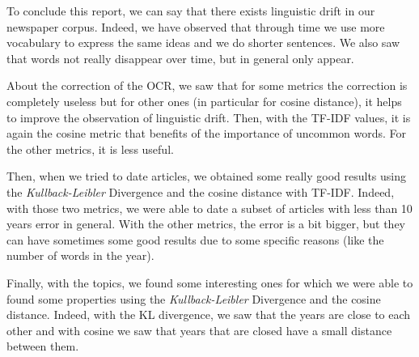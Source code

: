 To conclude this report, we can say that there exists linguistic drift in our newspaper corpus. Indeed, we have observed that through time we use more vocabulary to express the same ideas and we do shorter sentences. We also saw that words not really disappear over time, but in general only appear.

About the correction of the OCR, we saw that for some metrics the correction is completely useless but for other ones (in particular for cosine distance), it helps to improve the observation of linguistic drift. Then, with the TF-IDF values, it is again the cosine metric that benefits of the importance of uncommon words. For the other metrics, it is less useful.

Then, when we tried to date articles, we obtained some really good results using the \emph{Kullback-Leibler} Divergence and the cosine distance with TF-IDF. Indeed, with those two metrics, we were able to date a subset of articles with less than 10 years error in general. With the other metrics, the error is a bit bigger, but they can have sometimes some good results due to some specific reasons (like the number of words in the year).

Finally, with the topics, we found some interesting ones for which we were able to found some properties using the \emph{Kullback-Leibler} Divergence and the cosine distance. Indeed, with the KL divergence, we saw that the years are close to each other and with cosine we saw that years that are closed have a small distance between them.